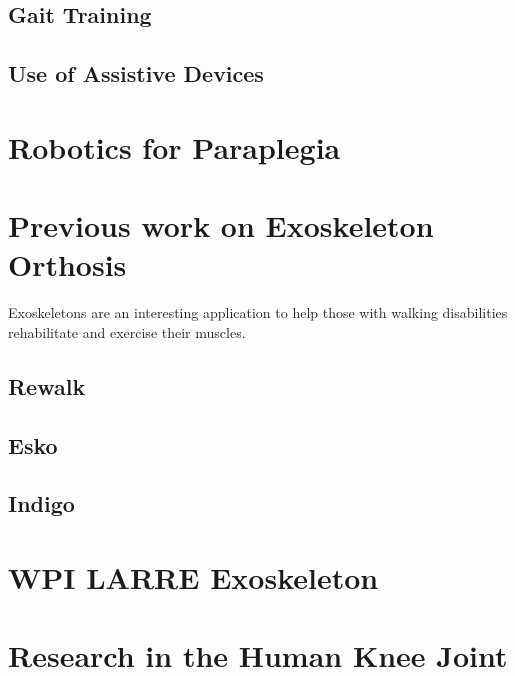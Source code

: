 \subsection{Gait Training}

\subsection{Use of Assistive Devices}


\section{Robotics for Paraplegia}


\section{Previous work on Exoskeleton Orthosis}
Exoskeletons are an interesting application to help those with walking disabilities rehabilitate and exercise their muscles.

\subsection{Rewalk}

\subsection{Esko}

\subsection{Indigo}

\section{WPI LARRE Exoskeleton}

\section{Research in the Human Knee Joint}
